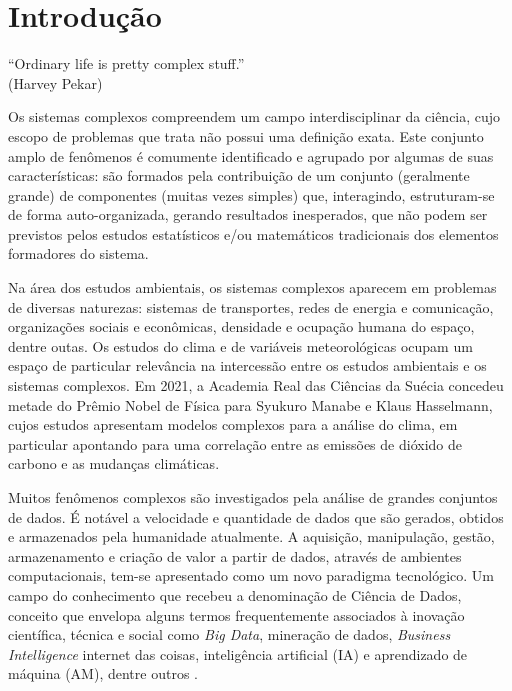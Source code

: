 \chapter{Introdução}
\label{cap:introducao}


\begin{flushright}
``Ordinary life is pretty complex stuff.''\\[10px]
(Harvey Pekar)
\end{flushright}

Os sistemas complexos compreendem um campo interdisciplinar da ciência, cujo escopo de problemas que trata não possui uma definição exata. Este conjunto amplo de fenômenos é comumente identificado e agrupado por algumas de suas características: são formados pela contribuição de um conjunto (geralmente grande) de componentes (muitas vezes simples) que, interagindo, estruturam-se de forma auto-organizada, gerando resultados inesperados, que não podem ser previstos pelos estudos estatísticos e/ou matemáticos tradicionais dos elementos formadores do sistema.

Na área dos estudos ambientais, os sistemas complexos aparecem em problemas de diversas naturezas: sistemas de transportes, redes de energia e comunicação, organizações sociais e econômicas, densidade e ocupação humana do espaço, dentre outas. Os estudos do clima e de variáveis meteorológicas ocupam um espaço de particular relevância na intercessão entre os estudos ambientais e os sistemas complexos. Em 2021, a Academia Real das Ciências da Suécia concedeu metade do Prêmio Nobel de Física para Syukuro Manabe e Klaus Hasselmann, cujos estudos apresentam modelos complexos para a análise do clima, em particular apontando para uma correlação entre as emissões de dióxido de carbono e as mudanças climáticas.

Muitos fenômenos complexos são investigados pela análise de grandes conjuntos de dados. É notável a velocidade e quantidade de dados que são gerados, obtidos e armazenados pela humanidade atualmente. A aquisição, manipulação, gestão, armazenamento e criação de valor a partir de dados, através de ambientes computacionais, tem-se apresentado como um novo paradigma tecnológico. Um campo do conhecimento que recebeu a denominação de Ciência de Dados, conceito que envelopa alguns termos frequentemente associados à inovação científica, técnica e social como \emph{Big Data}, mineração de dados, \emph{Business Intelligence} internet das coisas, inteligência artificial (IA) e aprendizado de máquina (AM), dentre outros \cite[p. 12-13]{EMCdata2015}.

